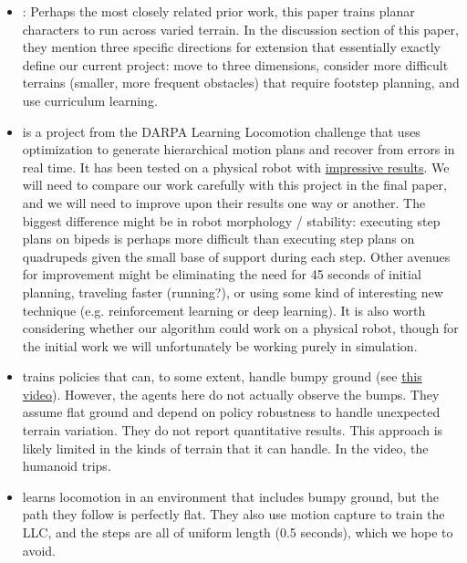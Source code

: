 \documentclass[a4paper]{article}
\begin{document}
\begin{itemize}
  \item \cite{peng2016terrain}: Perhaps the most closely related prior work, this paper trains planar characters to run across varied terrain.
    In the discussion section of this paper, they mention three specific directions for extension that essentially exactly define our current project: move to three dimensions, consider more difficult terrains (smaller, more frequent obstacles) that require footstep planning, and use curriculum learning.

  \item \cite{zucker2010optimization} is a project from the DARPA Learning Locomotion challenge that uses optimization to generate hierarchical motion plans and recover from errors in real time.
    It has been tested on a physical robot with \href{https://www.youtube.com/watch?v=KpqFebvRLeQ}{impressive results}.
    We will need to compare our work carefully with this project in the final paper, and we will need to improve upon their results one way or another.
    The biggest difference might be in robot morphology / stability: executing step plans on bipeds is perhaps more difficult than executing step plans on quadrupeds given the small base of support during each step.
    Other avenues for improvement might be eliminating the need for 45 seconds of initial planning, traveling faster (running?), or using some kind of interesting new technique (e.g. reinforcement learning or deep learning).
    It is also worth considering whether our algorithm could work on a physical robot, though for the initial work we will unfortunately be working purely in simulation.

  \item \cite{heess2017emergence} trains policies that can, to some extent, handle bumpy ground (see \href{https://www.youtube.com/watch?v=hx_bgoTF7bs&feature=youtu.be&t=1m28s}{this video}).
    However, the agents here do not actually observe the bumps.
    They assume flat ground and depend on policy robustness to handle unexpected terrain variation.
    They do not report quantitative results.
    This approach is likely limited in the kinds of terrain that it can handle.
    In the video, the humanoid trips.

  \item \cite{peng2017deeploco}
    learns locomotion in an environment that includes bumpy ground, but the path they follow is perfectly flat.
    They also use motion capture to train the LLC, and the steps are all of uniform length (0.5 seconds), which we hope to avoid.


\end{itemize}
\end{document}
